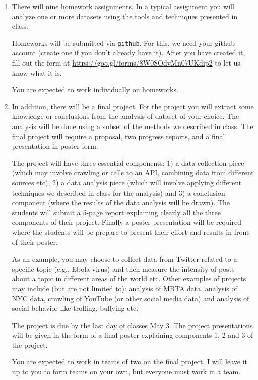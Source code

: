 \documentclass[11pt]{article}
\begin{document}
\begin{enumerate}
\item There will nine homework assignments.  In a typical 
assignment you will 
analyze one or more datasets using the tools and techniques presented in
class.

Homeworks will be submitted via \texttt{github}.   For this, we
  need your github account (create one if you don't already have it).
  After you have created it, fill out the form at
  \url{https://goo.gl/forms/8W0SOdvMn07UKdip2} to let us know what it is.

You are expected to work individually on homeworks.

\item In addition, there will be a final project.  For the project you
  will extract some
knowledge or conclusions from the analysis of dataset of your choice. The analysis
will be done using a subset of the methods we described in class.  The
final project will require a proposal, two progress reports, and a final
presentation in poster form.

The project will have three essential components: 1) a data collection
piece (which may involve crawling or calls to an API, combining data
from different sources etc), 2) a data analysis piece (which will
involve applying different techniques we described in class for the
analysis) and 3) a conclusion component (where the results of the data
analysis will be drawn).  The students will submit a 5-page report
explaining clearly all the three components of their project. Finally a
poster presentation will be required where the students will be prepare
to present their effort and results in front of their poster. 

As an example, you may choose to collect data from Twitter related
to a specific topic (e.g., Ebola virus) and then measure the intensity
of posts about a topic in different areas of the world etc.  Other
examples of projects may include (but are not limited to): analysis of
MBTA data, analysis of NYC data, crawling of YouTube (or other social
media data) and analysis of social behavior like trolling, bullying
etc. 

The project is due by the last day of classes May 3.
The project presentations will be
given in the form of a final poster explaining components 1, 2 and 3 of
the project. 

You are expected to work in teams of two on the final project.   I will
leave it up to you to form teams on your own, but everyone must work in
a team.

\end{enumerate}
\end{document}

